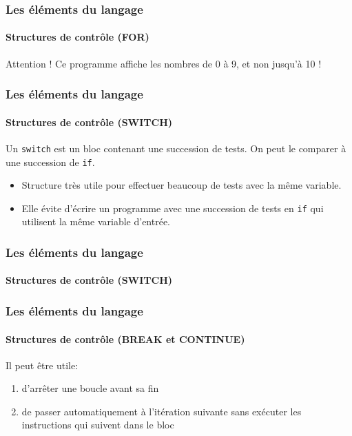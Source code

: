 		\begin{frame}[fragile]
			\frametitle{Les éléments du langage}
			\framesubtitle{Structures de contrôle (FOR)}
			\begin{example}
				
			\end{example}
			\pause{}
			\begin{alertblock}{Attention !}
				Ce programme affiche les nombres de 0 à 9, et non jusqu'à 10 !
			\end{alertblock}
		\end{frame}
	
		\begin{frame}[fragile]
			\frametitle{Les éléments du langage}
			\framesubtitle{Structures de contrôle (SWITCH)}
			\begin{definition}
				Un \lstinline|switch| est un bloc contenant une succession de tests. On peut le comparer à une succession de \lstinline|if|.
			\end{definition}
			\pause{}
			\begin{itemize}
				\item Structure très utile pour effectuer beaucoup de tests avec la même variable.
				\item Elle évite d'écrire un programme avec une succession de tests en \lstinline|if| qui utilisent \alert{la même} variable d'entrée. 
			\end{itemize}
			
		\end{frame}
	
		\begin{frame}[fragile]
			\frametitle{Les éléments du langage}
			\framesubtitle{Structures de contrôle (SWITCH)}
			\begin{syntaxe}
				
			\end{syntaxe}
			
		\end{frame}
	
		\begin{frame}[fragile]
			\frametitle{Les éléments du langage}
			\framesubtitle{Structures de contrôle (BREAK et CONTINUE)}
			\begin{remarque}
				Il peut être utile:
				\begin{enumerate}
					\item <2-> d'arrêter une boucle avant sa fin
					\item <3-> de passer automatiquement à l'itération suivante sans exécuter les instructions qui suivent dans le bloc
				\end{enumerate}
			\end{remarque}
			
		\end{frame}